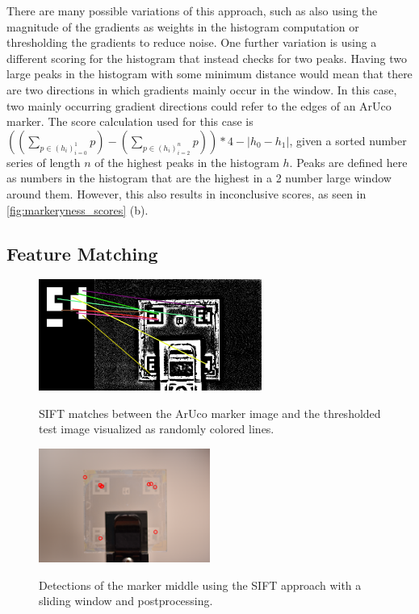 \documentclass[10pt]{book}
\newcommand{\figurereft}[2]{\autoref{#1} #2}
\begin{document}
There are many possible variations of this approach, such as also using the magnitude of the gradients as weights in the histogram computation or thresholding the gradients to reduce noise. One further variation is using a different scoring for the histogram that instead checks for two peaks. Having two large peaks in the histogram with some minimum distance would mean that there are two directions in which gradients mainly occur in the window. In this case, two mainly occurring gradient directions could refer to the edges of an \ac{ArUco} marker. The score calculation used for this case is $((\sum_{p \in (h_i)^1_{i=0}}p) - (\sum_{p \in (h_i)^n_{i=2}}p)) * 4 - |h_0 - h_1|$, given a sorted number series of length $n$ of the highest peaks in the histogram $h$. Peaks are defined here as numbers in the histogram that are the highest in a 2 number large window around them. However, this also results in inconclusive scores, as seen in \figurereft{fig:markeryness_scores}{(b)}.

\subsection{Feature Matching}

\begin{figure} %
  \caption{\ac{SIFT} matches between the \ac{ArUco} marker image and the thresholded test image visualized as randomly colored lines.}
  \includegraphics[width=0.65\textwidth]{image/classic_sift_matches}
  \label{fig:classic_sift_matches}
\end{figure}

\begin{figure}
  \caption{Detections of the marker middle using the \ac{SIFT} approach with a sliding window and postprocessing.}
  \includegraphics[width=0.5\textwidth]{image/classic_sift_final_matches}
  \label{fig:classic_sift_final_matches}
\end{figure}
\end{document}
